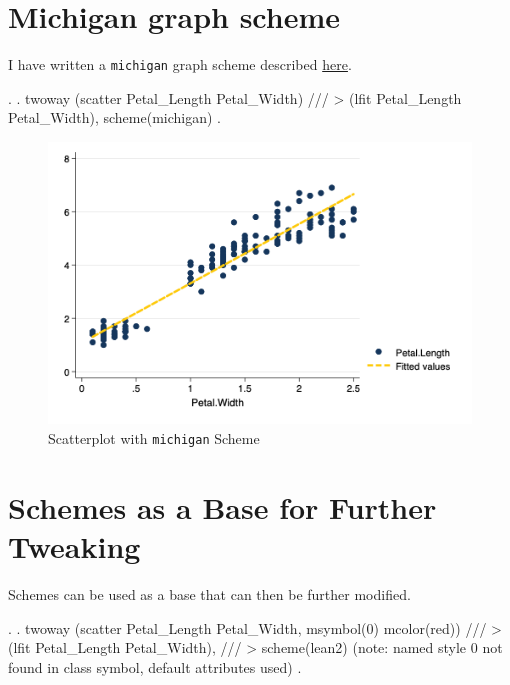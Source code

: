 \documentclass[]{article}
\begin{document}
\hypertarget{michigan-graph-scheme}{%
\section{Michigan graph scheme}\label{michigan-graph-scheme}}

I have written a \texttt{michigan} graph scheme described
\href{https://agrogan1.github.io/Stata/}{here}.

\begin{stlog}
. 
. twoway (scatter Petal_Length Petal_Width) /// 
> (lfit Petal_Length Petal_Width), scheme(michigan)
{\smallskip}
. 
\end{stlog}

\begin{stlog}


{\smallskip}

\end{stlog}

\begin{figure}
\centering
\includegraphics[width=0.75\linewidth]{michiganscatter.png}
\caption{Scatterplot with \texttt{michigan} Scheme}
\end{figure}

\hypertarget{schemes-as-a-base-for-further-tweaking}{%
\section{Schemes as a Base for Further
Tweaking}\label{schemes-as-a-base-for-further-tweaking}}

Schemes can be used as a base that can then be further modified.

\begin{stlog}
. 
. twoway (scatter Petal_Length Petal_Width, msymbol(0) mcolor(red)) ///
> (lfit Petal_Length Petal_Width), ///
> scheme(lean2) 
(note:  named style 0 not found in class symbol, default attributes used)
{\smallskip}
. 
\end{stlog}
\end{document}
